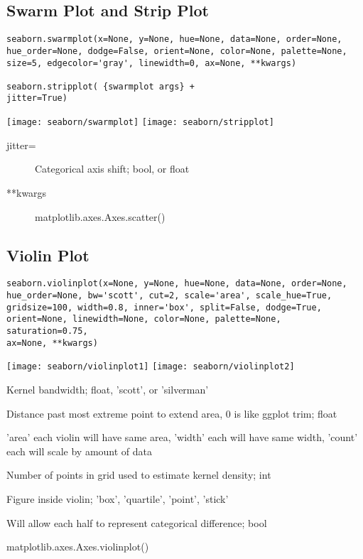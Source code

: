 \subsection{Swarm Plot and Strip Plot}
\begin{verbatim}
seaborn.swarmplot(x=None, y=None, hue=None, data=None, order=None,
hue_order=None, dodge=False, orient=None, color=None, palette=None,
size=5, edgecolor='gray', linewidth=0, ax=None, **kwargs)

seaborn.stripplot( {swarmplot args} +
jitter=True)
\end{verbatim}
\texttt{[image: seaborn/swarmplot]}
\texttt{[image: seaborn/stripplot]}
\begin{description}
	\item[jitter=] Categorical axis shift; bool, or float
	\item[**kwargs] matplotlib.axes.Axes.scatter()
\end{description}

\subsection{Violin Plot}
\begin{verbatim}
seaborn.violinplot(x=None, y=None, hue=None, data=None, order=None,
hue_order=None, bw='scott', cut=2, scale='area', scale_hue=True,
gridsize=100, width=0.8, inner='box', split=False, dodge=True,
orient=None, linewidth=None, color=None, palette=None, saturation=0.75,
ax=None, **kwargs)
\end{verbatim}
\texttt{[image: seaborn/violinplot1]}
\texttt{[image: seaborn/violinplot2]}
\begin{description}[itemsep=0pt]
	\item[bw=] Kernel bandwidth; float, 'scott', or 'silverman'
	\item[cut=] Distance past most extreme point to extend area, 0 is like ggplot trim; float
	\item[scale=] 'area' each violin will have same area, 'width' each will have same width, 'count' each will scale by amount of data
	\item[gridsize=] Number of points in grid used to estimate kernel density; int
	\item[inner=] Figure inside violin; 'box', 'quartile', 'point', 'stick'
	\item[split=] Will allow each half to represent categorical difference; bool
	\item[**kwargs] matplotlib.axes.Axes.violinplot()
\end{description}

